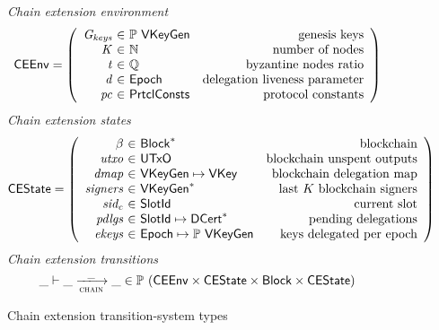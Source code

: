 \begin{figure}
  \emph{Chain extension environment}
  \begin{equation*}
    \CEEnv =
    \left(
      \begin{array}{r@{~\in~}lr}
        \var{\Gkeys} & \powerset{\VKeyGen} & \text{genesis keys}\\
        \var{K} & \mathbb{N} & \text{number of nodes}\\
        \var{t} & \mathbb{Q} & \text{byzantine nodes ratio}\\
        \var{d} & \Epoch & \text{delegation liveness parameter}\\
        \var{pc} & \PrtclConsts & \text{protocol constants}\\
      \end{array}
    \right)
  \end{equation*}
  \emph{Chain extension states}
  \begin{equation*}
    \CEState =
    \left(
      \begin{array}{r@{~\in~}lr}
        \beta & \seqof{\Block} & \text{blockchain}\\
        \var{utxo} & \UTxO & \text{blockchain unspent outputs}\\
        \var{dmap} & \VKeyGen \mapsto \VKey & \text{blockchain delegation map}\\
        \var{signers} & \seqof{\VKeyGen} & \text{last $K$ blockchain signers}\\
        \var{sid_c} & \SlotId & \text{current slot}\\
        \var{pdlgs} & \SlotId \mapsto \seqof{\DCert} & \text{pending delegations}\\
        \var{ekeys} & \Epoch \mapsto \powerset{\VKeyGen} & \text{keys delegated per epoch}
      \end{array}
    \right)
  \end{equation*}
  \emph{Chain extension transitions}
  \begin{equation*}
    \_ \vdash \_ \trans{chain}{\_} \_ \in
      \powerset (\CEEnv \times \CEState \times \Block \times \CEState)
  \end{equation*}
  \caption{Chain extension transition-system types}
  \label{fig:ts-types:chain-extension}
\end{figure}

